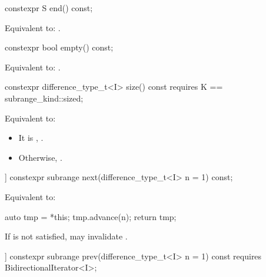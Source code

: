 %
\begin{itemdecl}
constexpr S end() const;
\end{itemdecl}

\begin{itemdescr}
\pnum
\effects Equivalent to: .
\end{itemdescr}

%
\begin{itemdecl}
constexpr bool empty() const;
\end{itemdecl}

\begin{itemdescr}
\pnum
\effects Equivalent to: .
\end{itemdescr}

%
\begin{itemdecl}
constexpr difference_type_t<I> size() const
  requires K == subrange_kind::sized;
\end{itemdecl}

\begin{itemdescr}
\pnum
\effects Equivalent to:
\begin{itemize}
\item It  is , .
\item Otherwise, .
\end{itemize}
\end{itemdescr}

%
\begin{itemdecl}
[[nodiscard]] constexpr subrange next(difference_type_t<I> n = 1) const;
\end{itemdecl}

\begin{itemdescr}
\pnum
\effects Equivalent to:
\begin{codeblock}
auto tmp = *this;
tmp.advance(n);
return tmp;
\end{codeblock}

\pnum
\enternote If  is not satisfied,  may
invalidate . \exitnote
\end{itemdescr}

%
\begin{itemdecl}
[[nodiscard]] constexpr subrange prev(difference_type_t<I> n = 1) const
  requires BidirectionalIterator<I>;
\end{itemdecl}

